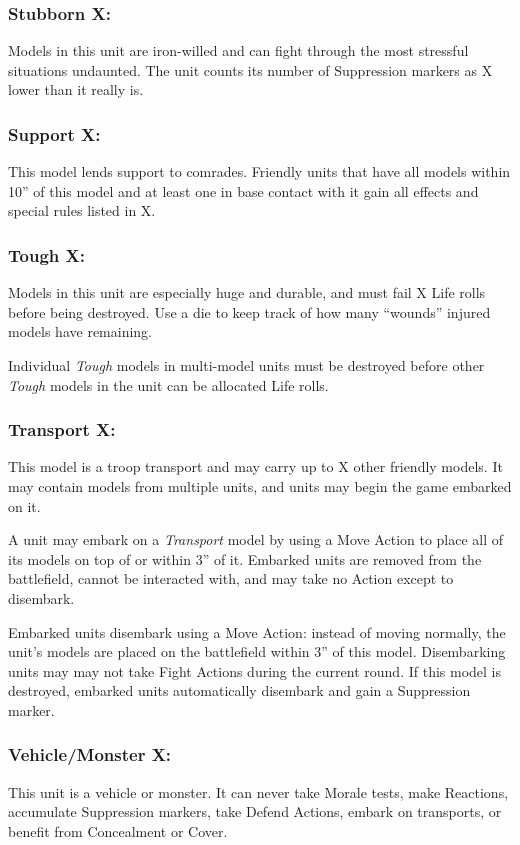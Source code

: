 \begin{multicols}{2}
\subsubsection*{Stubborn X:} Models in this unit are iron-willed and can fight through the most stressful situations undaunted. The unit counts its number of Suppression markers as X lower than it really is.

\subsubsection*{Support X:} This model lends support to comrades. Friendly units that have all models within 10'' of this model and at least one in base contact with it gain all effects and special rules listed in X.

\subsubsection*{Tough X:} Models in this unit are especially huge and durable, and must fail X Life rolls before being destroyed. Use a die to keep track of how many ``wounds'' injured models have remaining.

Individual \textit{Tough} models in multi-model units must be destroyed before other \textit{Tough} models in the unit can be allocated Life rolls.

\subsubsection*{Transport X:} This model is a troop transport and may carry up to X other friendly models. It may contain models from multiple units, and units may begin the game embarked on it.

A unit may embark on a \textit{Transport} model by using a Move Action to place all of its models on top of or within 3'' of it. Embarked units are removed from the battlefield, cannot be interacted with, and may take no Action except to disembark.

Embarked units disembark using a Move Action: instead of moving normally, the unit's models are placed on the battlefield within 3'' of this model. Disembarking units may may not take Fight Actions during the current round. If this model is destroyed, embarked units automatically disembark and gain a Suppression marker.

\subsubsection*{Vehicle/Monster X:} This unit is a vehicle or monster. It can never take Morale tests, make Reactions, accumulate Suppression markers, take Defend Actions, embark on transports, or benefit from Concealment or Cover.


\end{multicols}
